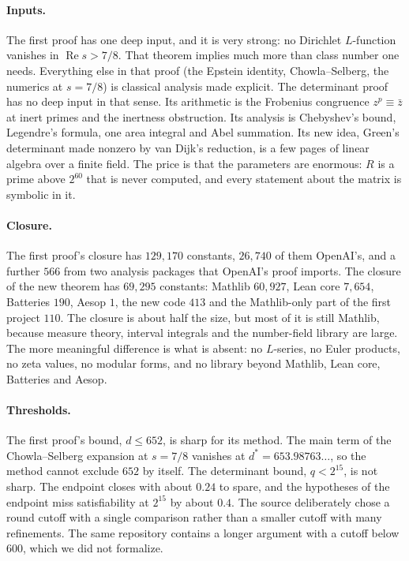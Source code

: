 \documentclass[11pt]{article}
\theoremstyle{definition}
\newcommand{\re}{\operatorname{Re}}
\begin{document}
\paragraph{Inputs.} The first proof has one deep input, and it is very strong: no Dirichlet $L$-function vanishes in $\re s > 7/8$. That theorem implies much more than class number one needs. Everything else in that proof (the Epstein identity, Chowla--Selberg, the numerics at $s = 7/8$) is classical analysis made explicit. The determinant proof has no deep input in that sense. Its arithmetic is the Frobenius congruence $z^p \equiv \bar z$ at inert primes and the inertness obstruction. Its analysis is Chebyshev's bound, Legendre's formula, one area integral and Abel summation. Its new idea, Green's determinant made nonzero by van Dijk's reduction, is a few pages of linear algebra over a finite field. The price is that the parameters are enormous: $R$ is a prime above $2^{60}$ that is never computed, and every statement about the matrix is symbolic in it.

\paragraph{Closure.} The first proof's closure has $129{,}170$ constants, $26{,}740$ of them OpenAI's, and a further $566$ from two analysis packages that OpenAI's proof imports. The closure of the new theorem has $69{,}295$ constants: Mathlib $60{,}927$, Lean core $7{,}654$, Batteries $190$, Aesop $1$, the new code $413$ and the Mathlib-only part of the first project $110$. The closure is about half the size, but most of it is still Mathlib, because measure theory, interval integrals and the number-field library are large. The more meaningful difference is what is absent: no $L$-series, no Euler products, no zeta values, no modular forms, and no library beyond Mathlib, Lean core, Batteries and Aesop.

\paragraph{Thresholds.} The first proof's bound, $d \le 652$, is sharp for its method. The main term of the Chowla--Selberg expansion at $s = 7/8$ vanishes at $d^* = 653.98763\ldots$, so the method cannot exclude $652$ by itself. The determinant bound, $q < 2^{15}$, is not sharp. The endpoint closes with about $0.24$ to spare, and the hypotheses of the endpoint miss satisfiability at $2^{15}$ by about $0.4$. The source deliberately chose a round cutoff with a single comparison rather than a smaller cutoff with many refinements. The same repository contains a longer argument with a cutoff below $600$, which we did not formalize.
\end{document}
